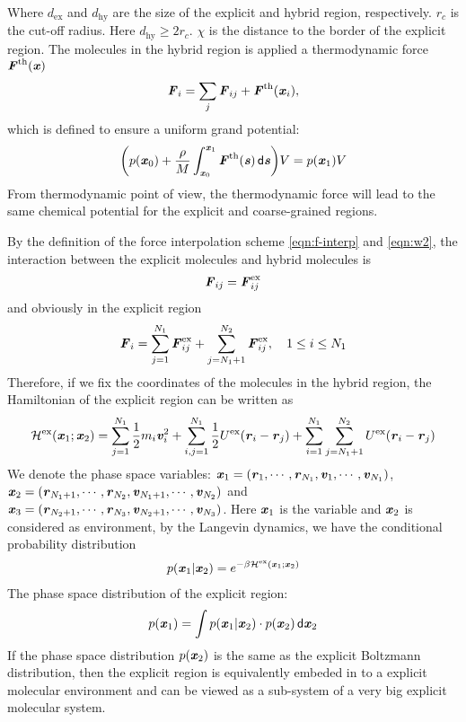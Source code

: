 \documentclass[aps,pre,preprint]{revtex4}
\renewcommand{\v}[1]{\textbf{\textit{#1}}}
\renewcommand{\d}[1]{\textsf{#1}}
\begin{document}
Where $d_{\textrm{ex}}$ and $d_{\textrm{hy}}$ are the size of the
explicit and hybrid region, respectively. $r_c$ is the cut-off
radius. Here $d_{\textrm{hy}} \geq 2r_c$. $\chi$ is the distance to
the border of the explicit region.  The molecules in the hybrid region
is applied a thermodynamic force $\v F^{\textrm{th}}(\v x)$
\begin{align}
  \v F_i = \sum_j\v F_{ij} + \v F^{\textrm{th}}(\v x_i),
\end{align}
which is defined to ensure a uniform grand potential:
\begin{align}
  \bigg(
  p(\v x_0) +
  \frac{\rho}{M}\int_{\v x_0}^{\v x_1}\v F^{\textrm{th}}(\v s)\,\d d\v s
  \bigg) V
  =
  p(\v x_1) V
\end{align}
From thermodynamic point of view, the thermodynamic force will lead
to the same chemical potential for the explicit and coarse-grained regions.

By the definition of the force interpolation scheme
\eqref{eqn:f-interp} and \eqref{eqn:w2}, the interaction between the
explicit molecules and hybrid molecules is
\begin{align}
  \v F_{ij} = \v F^{\textrm{ex}}_{ij}
\end{align}
and obviously in the explicit region
\begin{align}
  \v F_i =
  \sum_{j=1}^{N_1}\v F^{\textrm{ex}}_{ij} + \sum_{j=N_1+1}^{N_2}\v F^{\textrm{ex}}_{ij}, \quad 1\leq i \leq N_1
\end{align}
Therefore, if we fix the coordinates of the molecules in the hybrid
region, the Hamiltonian of the explicit region can be written as
\begin{align}
  \mathcal H^{\textrm{ex}}(\v x_1; \v x_2) =
  \sum_{j=1}^{N_1}\frac12 m_i\v v_i^2 + 
  \sum_{i,j=1}^{N_1}\frac12 U^{\textrm{ex}}(\v r_i - \v r_j) + 
  \sum_{i=1}^{N_1}\sum_{j=N_1+1}^{N_2} U^{\textrm{ex}}(\v r_i - \v r_j) 
\end{align}
We denote the phase space variables: $\v x_1 = (\v r_1, \cdots, \v
r_{N_1}, \v v_1, \cdots, \v v_{N_1})$,  $\v x_2 = (\v r_{N_1+1},
\cdots, \v r_{N_2}, \v v_{N_1+1}, \cdots, \v v_{N_2})$ and
$\v x_3 = (\v r_{N_2+1},
\cdots, \v r_{N_3}, \v v_{N_2+1}, \cdots, \v v_{N_3})$.
Here $\v x_1$ is the variable and $\v x_2$ is considered as environment, 
by the Langevin dynamics, we have the conditional probability distribution
\begin{align}
  p (\v x_1 \vert \v x_2)  =
  e^{-\beta \mathcal H^{\textrm{ex}}(\v x_1; \v x_2)}
\end{align}
The phase space distribution of the explicit region:
\begin{align}
  p(\v x_1) = \int p(\v x_1\vert\v x_2)\cdot p (\v x_2) \,\d d\v x_2
\end{align}
If the phase space distribution $p(\v x_2)$ is the same as the explicit
Boltzmann distribution, then the explicit region is
equivalently embeded in to a explicit molecular environment and can be
viewed as a sub-system of a very big explicit molecular
system.
\end{document}
